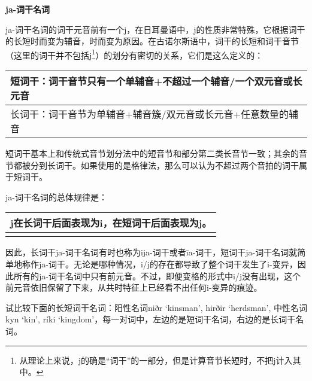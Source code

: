 \textbf{ja-词干名词}

ja-词干名词的词干元音前有一个j，在日耳曼语中，j的性质非常特殊，它根据词干的长短时而变为辅音，时而变为原因。在古诺尔斯语中，词干的长短和词干音节（这里的词干并不包括j\footnote{从理论上来说，j的确是``词干''的一部分，但是计算音节长短时，不把j计入其中。}）的划分有密切的关系，它们是这么定义的：

\begin{longtable}{l}
  \toprule
  短词干：词干音节只有一个单辅音+不超过一个辅音/一个双元音或长元音 \\
  \midrule
  \endhead
  \bottomrule
  \endfoot
  长词干：词干音节为单辅音+辅音簇/双元音或长元音+任意数量的辅音  \\
\end{longtable}

短词干基本上和传统式音节划分法中的短音节和部分第二类长音节一致；其余的音节都被分到长词干。如果使用的是格律法，那么可以认为不超过两个音拍的词干属于短词干。

ja-词干名词的总体规律是：

\begin{longtable}{l}
  \toprule
  j在长词干后面表现为i，在短词干后面表现为j。 \\
  \midrule
  \endhead
  \bottomrule
  \endfoot
\end{longtable}

因此，长词干ja-词干名词有时也称为ija-词干或者īa-词干，短词干ja-词干名词就简单地称作ja-词干。无论是哪种情况，i/j的存在都导致了整个词干发生了i-变异，因此所有的ja-词干名词中只有前元音。不过，即便变格的形式中i/j没有出现，这个前元音依旧保留了下来，从共时特征上已经看不出任何i-变异的痕迹。

试比较下面的长短词干名词：阳性名词niðr `kinsman', hirðir `herdsman',
中性名词kyn `kin', ríki
`kingdom'，每一对词中，左边的是短词干名词，右边的是长词干名词。

